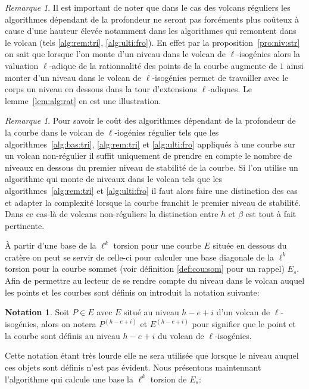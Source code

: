 \documentclass[10pt,a4paper]{book}
\theoremstyle{plain}
\theoremstyle{definition}
\theoremstyle{definition}
\theoremstyle{definition}
\theoremstyle{definition}
\theoremstyle{remark}
\newtheorem{rem}[thm]{Remarque}
\theoremstyle{remark}
\theoremstyle{definition}
\newtheorem{nota}[thm]{Notation}
\begin{document}
\begin{rem}
Il est important de noter que dans le cas des volcans réguliers les algorithmes
dépendant de la profondeur  ne seront pas forcéments plus coûteux à cause d'une 
hauteur élevée notamment dans les algorithmes qui remontent dans le volcan 
(tels \ref{alg:rem:tri}, \ref{alg:ulti:fro}). En effet par la 
proposition~\ref{pro:niv:str} on sait que lorsque l'on monte d'un niveau dans
le volcan de $\ell$-isogénies alors la valuation $\ell$-adique de la 
rationnalité des points de la courbe augmente de $1$ ainsi monter d'un niveau 
dans le volcan de $\ell$-isogénies permet de travailler avec le corps un niveau
en dessous dans la tour d'extensions $\ell$-adiques. Le lemme~\ref{lem:alg:rat}
en est une illustration.
\end{rem}

\begin{rem}
Pour savoir le coût des algorithmes dépendant de la profondeur de la courbe dans le volcan de $\ell$-iogénies régulier tels que les algorithmes~\ref{alg:bas:tri}, \ref{alg:rem:tri} et \ref{alg:ulti:fro}  appliqués à une courbe sur un volcan non-régulier il suffit uniquement de prendre en compte le nombre de niveaux en dessous du premier niveau de stabilité de la courbe. Si l'on utilise un algorithme qui monte de niveaux dans le volcan tels que les algorithmes~\ref{alg:rem:tri} et \ref{alg:ulti:fro} il faut alors faire une distinction des cas et adapter la complexité lorsque la courbe franchit le premier niveau de stabilité. Dans ce cas-là de volcans non-réguliers la distinction entre $h$ et $\beta$ est tout à fait pertinente.
\end{rem}

\`A partir d'une base de la $\ell^k$ torsion pour une courbe $E$ située en dessous du cratère on peut se servir de celle-ci pour calculer une base diagonale de la $\ell^k$ torsion pour la courbe sommet (voir définition \ref{def:cou:som} pour un rappel) $E_s$. Afin de permettre au lecteur de se rendre compte du niveau dans le volcan auquel les points et les courbes sont définis on introduit la notation suivante:
\begin{nota}
Soit $P \in E$ avec $E$ situé au niveau $h-e+i$ d'un volcan de $\ell$-isogénies, alors on notera $P^{(h-e+i)}$ et $E^{(h-e+i)}$ pour signifier que le point et la courbe sont définis au niveau $h-e+i$ du volcan de $\ell$-isogénies.
\end{nota}
Cette notation étant très lourde elle ne sera utilisée que lorsque le niveau auquel ces objets sont définis n'est pas évident.
 Nous présentons maintennant l'algorithme qui calcule une base la $\ell^k$ torsion de $E_s$:
\end{document}

